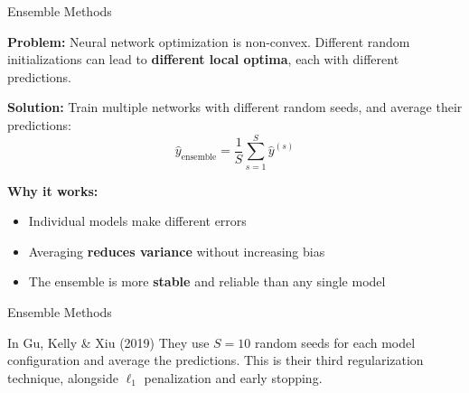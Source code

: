 \documentclass[aspectratio=169]{beamer}
\begin{document}
%
%
\begin{frame}{Ensemble Methods}

\textbf{Problem:} Neural network optimization is non-convex. Different random initializations can lead to \textbf{different local optima}, each with different predictions.

\medskip
\textbf{Solution:} Train multiple networks with different random seeds, and average their predictions:
\[
\hat{y}_{\text{ensemble}} = \frac{1}{S}\sum_{s=1}^S \hat{y}^{(s)}
\]

\textbf{Why it works:}
\begin{itemize}
    \item Individual models make different errors
    \item Averaging \textbf{reduces variance} without increasing bias
    \item The ensemble is more \textbf{stable} and reliable than any single model
\end{itemize}
\end{frame}
%
%
\begin{frame}{Ensemble Methods}
\vspace{0.3cm}
\begin{block}{In Gu, Kelly \& Xiu (2019)}
They use $S = 10$ random seeds for each model configuration and average the predictions. This is their third regularization technique, alongside $\ell_1$ penalization and early stopping.
\end{block}
\end{frame}
%
%
\end{document}
